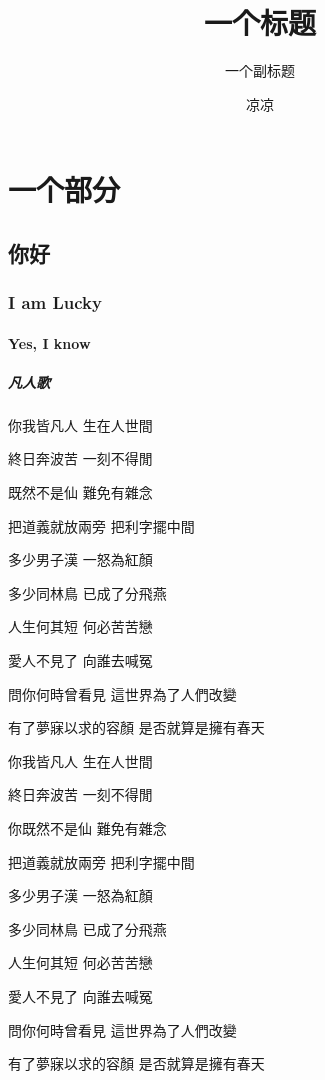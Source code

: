 \documentclass[geomode=oneside]{boook}
\title{一个标题}
\subtitle{一个副标题}
\author{凉凉}
\begin{document}
\maketitle
\tableofcontents

\part{一个部分}
\chapter{你好}
\section{I am Lucky}
\subsection{Yes, I know}
\subsubsection{凡人歌}
你我皆凡人 生在人世間

終日奔波苦 一刻不得閒

既然不是仙 難免有雜念

把道義就放兩旁 把利字擺中間

多少男子漢 一怒為紅顏

多少同林鳥 已成了分飛燕

人生何其短 何必苦苦戀

愛人不見了 向誰去喊冤

問你何時曾看見 這世界為了人們改變

有了夢寐以求的容顏 是否就算是擁有春天

你我皆凡人 生在人世間

終日奔波苦 一刻不得閒

你既然不是仙 難免有雜念

把道義就放兩旁 把利字擺中間

多少男子漢 一怒為紅顏

多少同林鳥 已成了分飛燕

人生何其短 何必苦苦戀

愛人不見了 向誰去喊冤

問你何時曾看見 這世界為了人們改變

有了夢寐以求的容顏 是否就算是擁有春天
\end{document}
